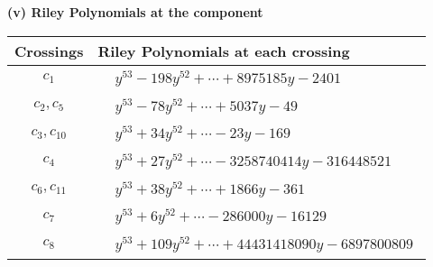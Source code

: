 \documentclass[1p]{elsarticle_modified}
\theoremstyle{definition}
\begin{document}
\newpage\renewcommand{\arraystretch}{1}
\flushleft \textbf{(v) Riley Polynomials at the component}\newline \\
\begin{tabular}{m{50pt}|m{274pt}}
Crossings & \hspace{64pt}Riley Polynomials at each crossing \\
\hline $$\begin{aligned}c_{1}\end{aligned}$$&$\begin{aligned}
&y^{53}-198 y^{52}+\cdots+8975185 y-2401
\end{aligned}$\\
\hline $$\begin{aligned}c_{2},c_{5}\end{aligned}$$&$\begin{aligned}
&y^{53}-78 y^{52}+\cdots+5037 y-49
\end{aligned}$\\
\hline $$\begin{aligned}c_{3},c_{10}\end{aligned}$$&$\begin{aligned}
&y^{53}+34 y^{52}+\cdots-23 y-169
\end{aligned}$\\
\hline $$\begin{aligned}c_{4}\end{aligned}$$&$\begin{aligned}
&y^{53}+27 y^{52}+\cdots-3258740414 y-316448521
\end{aligned}$\\
\hline $$\begin{aligned}c_{6},c_{11}\end{aligned}$$&$\begin{aligned}
&y^{53}+38 y^{52}+\cdots+1866 y-361
\end{aligned}$\\
\hline $$\begin{aligned}c_{7}\end{aligned}$$&$\begin{aligned}
&y^{53}+6 y^{52}+\cdots-286000 y-16129
\end{aligned}$\\
\hline $$\begin{aligned}c_{8}\end{aligned}$$&$\begin{aligned}
&y^{53}+109 y^{52}+\cdots+44431418090 y-6897800809
\end{aligned}$\\

\end{tabular}
\end{document}
